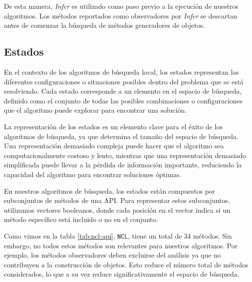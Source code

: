 De esta manera, \emph{Infer} es utilizado como paso previo a la ejecución de nuestros algoritmos. Los métodos reportados como observadores por \emph{Infer} se descartan antes de comenzar la búsqueda de métodos generadores de objetos.


\subsection{Estados}
\label{sec:estados}
En el contexto de los algoritmos de búsqueda local, los estados representan las diferentes configuraciones o situaciones posibles dentro del problema que se está resolviendo. Cada estado corresponde a un elemento en el espacio de búsqueda, definido como el conjunto de todas las posibles combinaciones o configuraciones que el algoritmo puede explorar para encontrar una solución.

La representación de los estados es un elemento clave para el éxito de los algoritmos de búsqueda, ya que determina el tamaño del espacio de búsqueda. 
Una representación demasiado compleja puede hacer que el algoritmo sea computacionalmente costoso y lento, mientras que una representación demasiado simplificada puede llevar a la pérdida de información importante, reduciendo la capacidad del algoritmo para encontrar soluciones óptimas.

En nuestros algoritmos de búsqueda, los estados están compuestos por subconjuntos de métodos de una API. Para representar estos subconjuntos, utilizamos vectores booleanos, donde cada posición en el vector indica si un método específico está incluido o no en el conjunto.

Como vimos en la tabla \ref{tab:ncl-api}, \texttt{NCL}, tiene un total de 34 métodos. Sin embargo, no todos estos métodos son relevantes para nuestros algoritmos. Por ejemplo, los métodos observadores deben excluirse del análisis ya que no contribuyen a la construcción de objetos. Esto reduce el número total de métodos considerados, lo que a su vez reduce significativamente el espacio de búsqueda.

